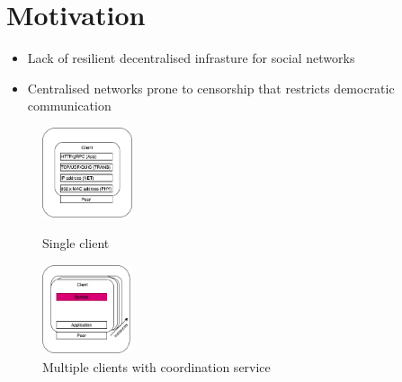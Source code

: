 \section{Motivation}

\begin{frame}
    \begin{itemize}
        \item Lack of resilient decentralised infrasture for social networks
        \item Centralised networks prone to censorship that restricts democratic communication
    \end{itemize}

    \begin{figure}
        \centering
        \begin{minipage}[t]{0.45\textwidth}
            \centering
            \includegraphics[width=100px,height=100px]{pics/before.png}
            \caption{Single client}
        \end{minipage}
        \hfill
        \begin{minipage}[t]{0.45\textwidth}
            \centering
            \begin{minipage}[t]{0.45\textwidth}
                \centering
                \includegraphics[width=100px,height=100px]{pics/after.png}
                \caption{Multiple clients with coordination service}
            \end{minipage}
        \end{minipage}
    \end{figure}
 \end{frame}